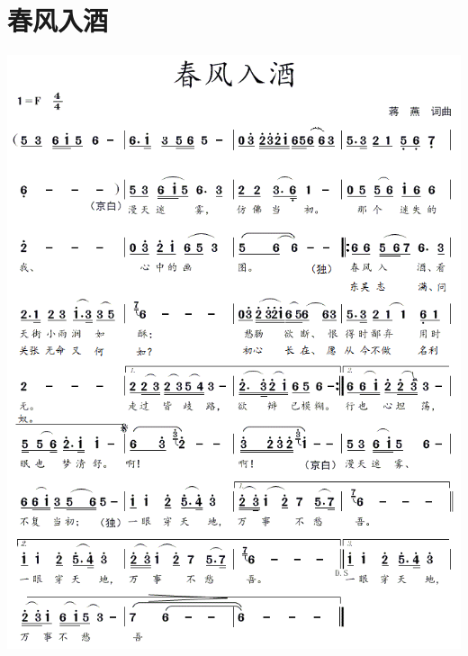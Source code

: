 \documentclass[cn,pad,twocol]{elegantbook}
\begin{document}
\section{春风入酒} \includegraphics[width=\textwidth]{rpi400/20210206春风入酒.png}
\end{document}
